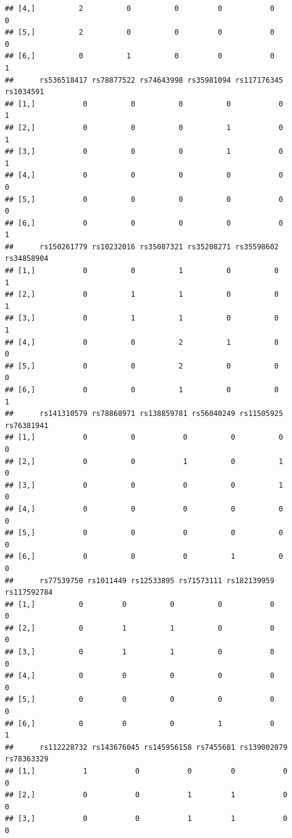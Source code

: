 \documentclass[
]{article}
\begin{document}
\begin{verbatim}
## [4,]          2          0          0         0           0         0
## [5,]          2          0          0         0           0         0
## [6,]          0          1          0         0           0         1
##      rs536518417 rs78877522 rs74643998 rs35981094 rs117176345 rs1034591
## [1,]           0          0          0          0           0         1
## [2,]           0          0          0          1           0         1
## [3,]           0          0          0          1           0         1
## [4,]           0          0          0          0           0         0
## [5,]           0          0          0          0           0         0
## [6,]           0          0          0          0           0         1
##      rs150261779 rs10232016 rs35087321 rs35208271 rs35598602 rs34858904
## [1,]           0          0          1          0          0          1
## [2,]           0          1          1          0          0          1
## [3,]           0          1          1          0          0          1
## [4,]           0          0          2          1          0          0
## [5,]           0          0          2          0          0          0
## [6,]           0          0          1          0          0          1
##      rs141310579 rs78868971 rs138859781 rs56040249 rs11505925 rs76381941
## [1,]           0          0           0          0          0          0
## [2,]           0          0           1          0          1          0
## [3,]           0          0           0          0          1          0
## [4,]           0          0           0          0          0          0
## [5,]           0          0           0          0          0          0
## [6,]           0          0           0          1          0          0
##      rs77539750 rs1011449 rs12533895 rs71573111 rs182139959 rs117592784
## [1,]          0         0          0          0           0           0
## [2,]          0         1          1          0           0           0
## [3,]          0         1          1          0           0           0
## [4,]          0         0          0          0           0           0
## [5,]          0         0          0          0           0           0
## [6,]          0         0          0          1           0           1
##      rs112228732 rs143676045 rs145956158 rs7455681 rs139002079 rs78363329
## [1,]           1           0           0         0           0          0
## [2,]           0           0           1         1           0          0
## [3,]           0           0           1         1           0          0

\end{verbatim}
\end{document}
